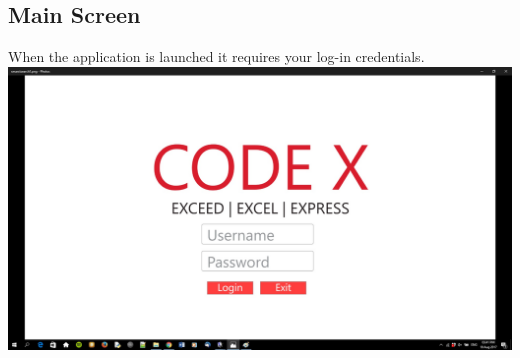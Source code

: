 \documentclass[a4paper,10pt]{article}
\begin{document}
	\subsection{Main Screen}
	When the application is launched it requires your log-in credentials.\\
	{\centering\includegraphics[width=15cm, scale=0.5]{smarctsearch1.jpg}}
\end{document}
